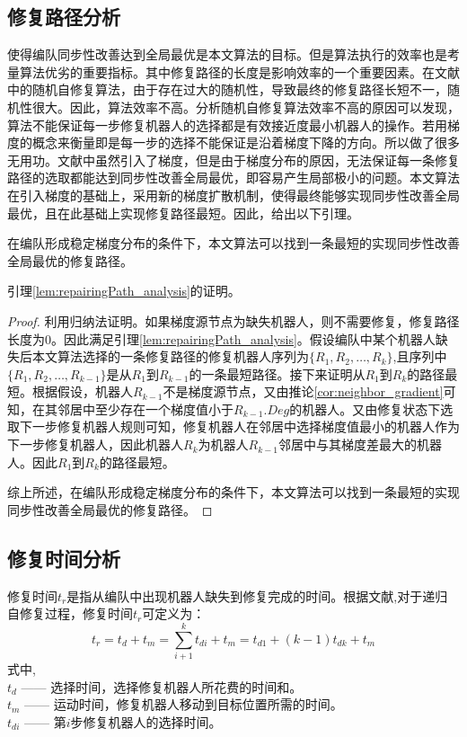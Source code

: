 \subsection{修复路径分析}
使得编队同步性改善达到全局最优是本文算法的目标。但是算法执行的效率也是考量算法优劣的重要指标。其中修复路径的长度是影响效率的一个重要因素。在文献\parencite{张飞2008移动机器人覆盖问题的研究}中的随机自修复算法，由于存在过大的随机性，导致最终的修复路径长短不一，随机性很大。因此，算法效率不高。分析随机自修复算法效率不高的原因可以发现，算法不能保证每一步修复机器人的选择都是有效接近度最小机器人的操作。若用梯度的概念来衡量即是每一步的选择不能保证是沿着梯度下降的方向。所以做了很多无用功。文献\parencite{liu2015gradient}中虽然引入了梯度，但是由于梯度分布的原因，无法保证每一条修复路径的选取都能达到同步性改善全局最优，即容易产生局部极小的问题。本文算法在引入梯度的基础上，采用新的梯度扩散机制，使得最终能够实现同步性改善全局最优，且在此基础上实现修复路径最短。因此，给出以下引理。
\begin{lem}
	\label{lem:repairingPath_analysis}
	在编队形成稳定梯度分布的条件下，本文算法可以找到一条最短的实现同步性改善全局最优的修复路径。
	
	引理\ref{lem:repairingPath_analysis}的证明。
	
	\begin{proof}
		利用归纳法证明。如果梯度源节点为缺失机器人，则不需要修复，修复路径长度为$0$。因此满足引理\ref{lem:repairingPath_analysis}。假设编队中某个机器人缺失后本文算法选择的一条修复路径的修复机器人序列为$\{R_1,R_2,\dots,R_k \}$,且序列中$\{R_1,R_2,\dots,R_{k-1} \}$是从$R_1$到$R_{k-1}$的一条最短路径。接下来证明从$R_1$到$R_k$的路径最短。根据假设，机器人$R_{k-1}$不是梯度源节点，又由推论\ref{cor:neighbor_gradient}可知，在其邻居中至少存在一个梯度值小于$R_{k-1}.Deg$的机器人。又由修复状态下选取下一步修复机器人规则可知，修复机器人在邻居中选择梯度值最小的机器人作为下一步修复机器人，因此机器人$R_k$为机器人$R_{k-1}$邻居中与其梯度差最大的机器人。因此$R_1$到$R_k$的路径最短。
		
		综上所述，在编队形成稳定梯度分布的条件下，本文算法可以找到一条最短的实现同步性改善全局最优的修复路径。
	\end{proof}
\end{lem}

\subsection{修复时间分析}
修复时间$t_r$是指从编队中出现机器人缺失到修复完成的时间。根据文献\parencite{张飞2008移动机器人覆盖问题的研究},对于递归自修复过程，修复时间$t_r$可定义为：\\
\begin{equation}
	t_r = t_d + t_m = \sum_{i+1}^k t_{di} + t_m = t_{d1} + (k-1)t_{dk} + t_m
\end{equation}
式中,\\
\indent $t_d$ —— 选择时间，选择修复机器人所花费的时间和。\\
\indent $t_m$ —— 运动时间，修复机器人移动到目标位置所需的时间。\\
\indent $t_{di}$ —— 第$i$步修复机器人的选择时间。

